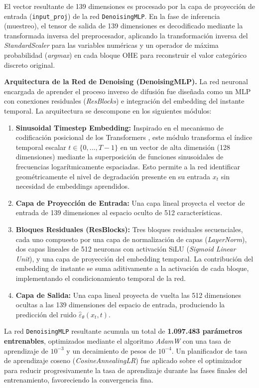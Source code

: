 El vector resultante de 139 dimensiones es procesado por la capa de proyección de entrada (\texttt{input\_proj}) de la red \texttt{DenoisingMLP}. En la fase de inferencia (muestreo), el tensor de salida de 139 dimensiones es decodificado mediante la transformada inversa del preprocesador, aplicando la transformación inversa del \textit{StandardScaler} para las variables numéricas y un operador de máxima probabilidad (\textit{argmax}) en cada bloque OHE para reconstruir el valor categórico discreto original.

\textbf{Arquitectura de la Red de Denoising (DenoisingMLP).} La red neuronal encargada de aprender el proceso inverso de difusión fue diseñada como un MLP con conexiones residuales (\textit{ResBlocks}) e integración del embedding del instante temporal. La arquitectura se descompone en los siguientes módulos:

\begin{enumerate}
    \item \textbf{Sinusoidal Timestep Embedding:} Inspirado en el mecanismo de codificación posicional de los Transformers \parencite{vaswani2017attention}, este módulo transforma el índice temporal escalar $t \in \{0, ..., T-1\}$ en un vector de alta dimensión (128 dimensiones) mediante la superposición de funciones sinusoidales de frecuencias logarítmicamente espaciadas. Esto permite a la red identificar geométricamente el nivel de degradación presente en su entrada $x_t$ sin necesidad de embeddings aprendidos.
    \item \textbf{Capa de Proyección de Entrada:} Una capa lineal proyecta el vector de entrada de 139 dimensiones al espacio oculto de 512 características.
    \item \textbf{Bloques Residuales (ResBlocks):} Tres bloques residuales secuenciales, cada uno compuesto por una capa de normalización de capas (\textit{LayerNorm}), dos capas lineales de 512 neuronas con activación SiLU (\textit{Sigmoid Linear Unit}), y una capa de proyección del embedding temporal. La contribución del embedding de instante se suma aditivamente a la activación de cada bloque, implementando el condicionamiento temporal de la red.
    \item \textbf{Capa de Salida:} Una capa lineal proyecta de vuelta las 512 dimensiones ocultas a las 139 dimensiones del espacio de entrada, produciendo la predicción del ruido $\hat{\varepsilon}_\theta(x_t, t)$.
\end{enumerate}

La red \texttt{DenoisingMLP} resultante acumula un total de \textbf{1.097.483 parámetros entrenables}, optimizados mediante el algoritmo \textit{AdamW} con una tasa de aprendizaje de $10^{-3}$ y un decaimiento de pesos de $10^{-4}$. Un planificador de tasa de aprendizaje coseno (\textit{CosineAnnealingLR}) fue aplicado sobre el optimizador para reducir progresivamente la tasa de aprendizaje durante las fases finales del entrenamiento, favoreciendo la convergencia fina.

